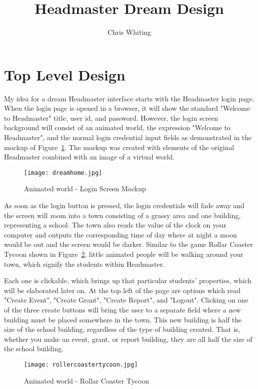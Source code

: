 \documentclass[11pt]{article}
\title{Headmaster Dream Design}
\author{Chris Whiting}
\begin{document}
\maketitle

 
\section{Top Level Design}
My idea for a dream Headmaster interface starts with the Headmaster login page. When the login page is opened in a browser, it will show the standard "Welcome to Headmaster" title, user id, and password. However, the login screen background will consist of an animated world, the expression "Welcome to Headmaster", and the normal login credential input fields as demonstrated in the mockup of Figure~\ref{homepage}. The mockup was created with elements of the original Headmaster combined with an image of a virtual world.

\begin{figure}[h]
\centering
\texttt{[image: dreamhome.jpg]}
\caption{Animated world - Login Screen Mockup}
\label{homepage}
\end{figure}

As soon as the login button is pressed, the login credentials will fade away and the screen will zoom into a town consisting of a grassy area and one building, representing a school. The town also reads the value of the clock on your computer and outputs the corresponding time of day where at night a moon would be out and the screen would be darker. Similar to the game Rollar Coaster Tycoon shown in Figure~\ref{RCT}, little animated people will be walking around your town, which signify the students within Headmaster.

 Each one is clickable, which brings up that particular students' properties, which will be elaborated later on. At the top left of the page are options which read "Create Event", "Create Grant", "Create Report", and "Logout". Clicking on one of the three create buttons will bring the user to a separate field where a new building must be placed somewhere in the town. This new building is half the size of the school building, regardless of the type of building created. That is, whether you make an event, grant, or report building, they are all half the size of the school building. 

\begin{figure}[h]
\centering
\texttt{[image: rollercoastertycoon.jpg]}
\caption{Animated world - Rollar Coaster Tycoon}
\label{RCT}
\end{figure}
\end{document}
